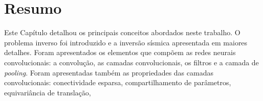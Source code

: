 \section{Resumo}

Este Capítulo detalhou os principais conceitos abordados neste trabalho. O
problema inverso foi introduzido e a inversão sísmica apresentada em
maiores detalhes. Foram apresentados os elementos que compõem as redes
neurais convolucionais: a convolução, as camadas convolucionais, os filtros e a camada de \textit{pooling}.
Foram apresentadas também as propriedades das camadas convolucionais: conectividade esparsa,
compartilhamento de parâmetros, equivariância de translação, 
